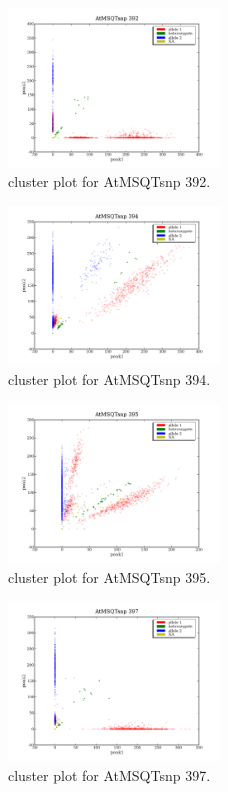 \begin{figure}[H]
\includegraphics[width=0.5\textwidth]{figures/cluster_plot_AtMSQTsnp_392.png}
\caption{cluster plot for AtMSQTsnp 392.} \label{flAtMSQTsnp392}
\end{figure}
\begin{figure}[H]
\includegraphics[width=0.5\textwidth]{figures/cluster_plot_AtMSQTsnp_394.png}
\caption{cluster plot for AtMSQTsnp 394.} \label{flAtMSQTsnp394}
\end{figure}
\begin{figure}[H]
\includegraphics[width=0.5\textwidth]{figures/cluster_plot_AtMSQTsnp_395.png}
\caption{cluster plot for AtMSQTsnp 395.} \label{flAtMSQTsnp395}
\end{figure}
\begin{figure}[H]
\includegraphics[width=0.5\textwidth]{figures/cluster_plot_AtMSQTsnp_397.png}
\caption{cluster plot for AtMSQTsnp 397.} \label{flAtMSQTsnp397}
\end{figure}
